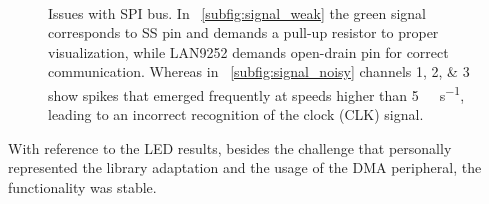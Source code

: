 \begin{figure}[tp]
    \centering
     \\
    \caption{Issues with SPI bus. In ~\ref{subfig:signal_weak} the green signal corresponds to SS pin and demands a pull-up resistor to proper visualization, while LAN9252 demands open-drain pin for correct communication.
            Whereas in ~\ref{subfig:signal_noisy} channels \numlist{1;2;3} show spikes that emerged frequently at speeds higher than \SI{5}{\mega\bit\per\second}, leading to an incorrect recognition of the clock (CLK) signal.}
    \label{fig:signal_noisy}
\end{figure}


With reference to the LED results, besides the challenge that personally represented the library adaptation and the usage of the DMA 
peripheral, the functionality was stable.

